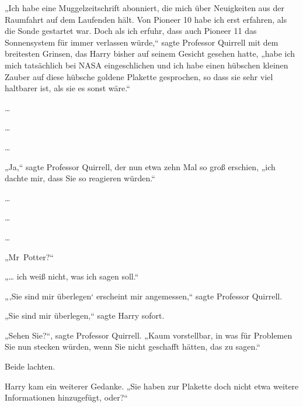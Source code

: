 „Ich habe eine Muggelzeitschrift abonniert, die mich über Neuigkeiten aus der Raumfahrt auf dem Laufenden hält. Von Pioneer 10 habe ich erst erfahren, als die Sonde gestartet war. Doch als ich erfuhr, dass auch Pioneer 11 das Sonnensystem für immer verlassen würde,“ sagte Professor Quirrell mit dem breitesten Grinsen, das Harry bisher auf seinem Gesicht gesehen hatte, „habe ich mich tatsächlich bei NASA eingeschlichen und ich habe einen hübschen kleinen Zauber auf diese hübsche goldene Plakette gesprochen, so dass sie sehr viel haltbarer ist, als sie es sonst wäre.“

…

…

…

„Ja,“ sagte Professor Quirrell, der nun etwa zehn Mal so groß erschien, „ich dachte mir, dass Sie so reagieren würden.“

…

…

…

„Mr~Potter?“

„… ich weiß nicht, was ich sagen soll.“

„‚Sie sind mir überlegen‘ erscheint mir angemessen,“ sagte Professor Quirrell.

„Sie sind mir überlegen,“ sagte Harry sofort.

„Sehen Sie?“, sagte Professor Quirrell. „Kaum vorstellbar, in was für Problemen Sie nun stecken würden, wenn Sie nicht geschafft hätten, das zu sagen.“

Beide lachten.

Harry kam ein weiterer Gedanke. „Sie haben zur Plakette doch nicht etwa weitere Informationen hinzugefügt, oder?“

